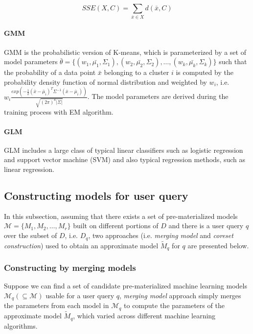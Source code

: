 \begin{equation}\label{eq: sse_k_means}
    SSE(X, C) = \sum_{\bar{x} \in X}d(\bar{x}, C)
\end{equation}

\paragraph{GMM} GMM is the probabilistic version of K-means, which is parameterized by a set of model parameters $\bar{\theta} = \{(w_1, \bar{\mu_1}, \Sigma_1), (w_2, \bar{\mu_2}, \Sigma_2), \dots, (w_k, \bar{\mu_k}, \Sigma_k)\}$ such that the probability of a data point $\bar{x}$ belonging to a cluster $i$ is computed by the probability density function of normal distribution and weighted by $w_i$, i.e.  $w_i\frac{exp(-\frac{1}{2}(\bar{x}-\bar{\mu}_i)^T\Sigma^{-1}(\bar{x}-\bar{\mu}_i))}{\sqrt{(2\pi)^k|\Sigma|}}$. The model parameters are derived during the training process with EM algorithm.

\paragraph{GLM} GLM includes a large class of typical linear classifiers such as logistic regression and support vector machine (SVM) and also typical regression methods, such as linear regression.

\subsection{Constructing models for user query}
In this subsection, assuming that there exists a set of pre-materialized models $\mathcal{M} = \{M_1, M_2, \dots, M_r\}$ built on different portions of $D$ and there is a user query $q$ over the subset of $D$, i.e. $D_q$, two approaches (i.e. {\em merging model} and {\em coreset construction}) used to obtain an approximate model $\tilde{M}_q$ for $q$ are presented below. 

\subsubsection{Constructing by merging models}
Suppose we can find a set of candidate pre-materialized machine learning models $\mathcal{M}_q (\subseteq \mathcal{M})$ usable for a user query $q$, {\em merging model} approach simply merges the parameters from each model in $\mathcal{M}_q$ to compute the parameters of the approximate model $\tilde{M}_q$, which varied across different machine learning algorithms.

